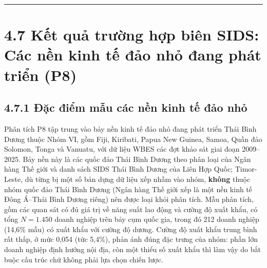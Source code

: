 \documentclass[
  a4paper,
  13pt]{extreport}
\begin{document}
\begin{center}\rule{0.5\linewidth}{0.5pt}\end{center}

\hypertarget{kux1ebft-quux1ea3-trux1b0ux1eddng-hux1ee3p-biuxean-sids-cuxe1c-nux1ec1n-kinh-tux1ebf-ux111ux1ea3o-nhux1ecf-ux111ang-phuxe1t-triux1ec3n-p8}{%
\section{4.7 Kết quả trường hợp biên SIDS: Các nền kinh tế đảo nhỏ đang
phát triển
(P8)}\label{kux1ebft-quux1ea3-trux1b0ux1eddng-hux1ee3p-biuxean-sids-cuxe1c-nux1ec1n-kinh-tux1ebf-ux111ux1ea3o-nhux1ecf-ux111ang-phuxe1t-triux1ec3n-p8}}

\hypertarget{ux111ux1eb7c-ux111iux1ec3m-mux1eabu-cuxe1c-nux1ec1n-kinh-tux1ebf-ux111ux1ea3o-nhux1ecf}{%
\subsection{4.7.1 Đặc điểm mẫu các nền kinh tế đảo
nhỏ}\label{ux111ux1eb7c-ux111iux1ec3m-mux1eabu-cuxe1c-nux1ec1n-kinh-tux1ebf-ux111ux1ea3o-nhux1ecf}}

Phân tích P8 tập trung vào bảy nền kinh tế đảo nhỏ đang phát triển Thái
Bình Dương thuộc Nhóm VI, gồm Fiji, Kiribati, Papua New Guinea, Samoa,
Quần đảo Solomon, Tonga và Vanuatu, với dữ liệu WBES các đợt khảo sát
giai đoạn 2009--2025. Bảy nền này là các quốc đảo Thái Bình Dương theo
phân loại của Ngân hàng Thế giới và danh sách SIDS Thái Bình Dương của
Liên Hợp Quốc; Timor-Leste, dù từng bị một số bản dựng dữ liệu xếp nhầm
vào nhóm, \textbf{không} thuộc nhóm quốc đảo Thái Bình Dương (Ngân hàng
Thế giới xếp là một nền kinh tế Đông Á--Thái Bình Dương riêng) nên được
loại khỏi phân tích. Mẫu phân tích, gồm các quan sát có đủ giá trị về
năng suất lao động và cường độ xuất khẩu, có tổng \(N = 1.450\) doanh
nghiệp trên bảy cụm quốc gia, trong đó 212 doanh nghiệp (14,6\% mẫu) có
xuất khẩu với cường độ dương. Cường độ xuất khẩu trung bình rất thấp, ở
mức 0,054 (tức 5,4\%), phản ánh đúng đặc trưng của nhóm: phần lớn doanh
nghiệp định hướng nội địa, còn một thiểu số xuất khẩu thì làm vậy do bắt
buộc cấu trúc chứ không phải lựa chọn chiến lược.
\end{document}

